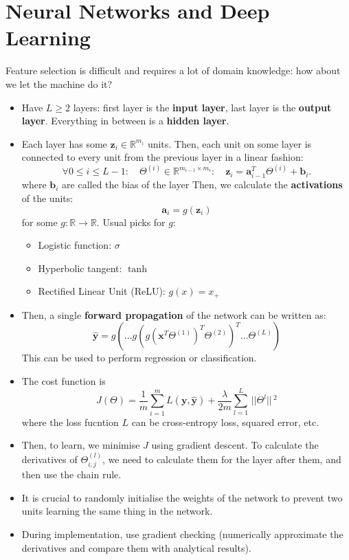 \documentclass{article}
\renewcommand{\vec}[1]{\mathbf{#1}}
\renewcommand{\|}{\,\,|\,\,}
\newcommand{\norm}[1]{\,||#1||\,}
\newcommand{\Reals}{\mathbb{R}}
\begin{document}
\section{Neural Networks and Deep Learning}
Feature selection is difficult and requires a lot of domain knowledge: how about
we let the machine do it?
\begin{itemize}
\item Have $L \geq 2$ layers: first layer is the \textbf{input layer}, last
  layer is the \textbf{output layer}. Everything in between is a \textbf{hidden layer}. 
\item Each layer has some $\vec{z}_i \in \Reals^{m_i}$ units. Then, each unit on some layer is
  connected to every unit from the previous layer in a linear fashion:
  \[
    \forall 0 \leq i \leq L-1:\quad\Theta^{(i)} \in \Reals^{m_{i - 1} \times
      m_i}:\quad \vec{z}_i = \vec{a}_{i-1}^T\Theta^{(i)} + \vec{b}_i. 
  \]
  where $\vec{b}_i$ are called the bias of the layer
  Then, we calculate the \textbf{activations} of the units:
  \[
    \vec{a}_i = g(\vec{z}_i)
  \]
  for some $g:\Reals \to \Reals$.
  Usual picks for $g$:
  \begin{itemize}
  \item Logistic function: $\sigma$
  \item Hyperbolic tangent: $\tanh$
  \item Rectified Linear Unit (ReLU): $g(x) = x_+$
  \end{itemize}
\item Then, a single \textbf{forward propagation} of the network can be written
  as:
  \[
    \hat{\vec{y}} = g(\hdots g(g(\vec{x}^T\Theta^{(1)})^T\Theta^{(2)})^T\hdots \Theta^{(L)})
  \]
  This can be used to perform regression or classification.
\item The cost function is
  \[
    J(\Theta) = \frac{1}{m} \sum_{i = 1}^m L(\vec{y}, \hat{\vec{y}}) +
    \frac{\lambda}{2m}\sum_{l = 1}^L \norm{\Theta^{l}}^2
  \]
  where the loss fucntion $L$ can be cross-entropy loss, squared error, etc.
\item Then, to learn, we minimise $J$ using gradient descent. To calculate the
  derivatives of $\Theta_{i, j}^{(l)}$, we need to calculate them for the layer
  after them, and then use the chain rule.
\item It is crucial to randomly initialise the weights of the network to prevent
  two units learning the same thing in the network.
\item During implementation, use gradient checking (numerically approximate the
  derivatives and compare them with analytical results).
\end{itemize}
\end{document}
